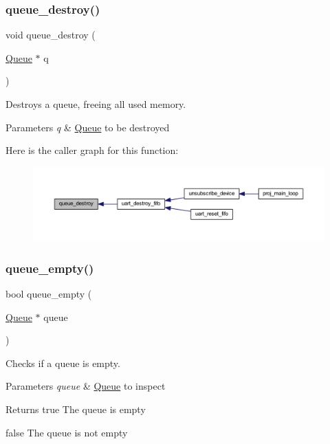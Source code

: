 \subsubsection{\texorpdfstring{queue\+\_\+destroy()}{queue\_destroy()}}
{\footnotesize\ttfamily void queue\+\_\+destroy (\begin{DoxyParamCaption}\item[{\mbox{\hyperlink{struct_queue}{Queue}} $\ast$}]{q }\end{DoxyParamCaption})}



Destroys a queue, freeing all used memory. 


\begin{DoxyParams}{Parameters}
{\em q} & \mbox{\hyperlink{struct_queue}{Queue}} to be destroyed \\
\hline
\end{DoxyParams}
Here is the caller graph for this function\+:\nopagebreak
\begin{figure}[H]
\begin{center}
\leavevmode
\includegraphics[width=350pt]{group__queue_gad21ee75924298937673e2b8d66665466_icgraph}
\end{center}
\end{figure}
\mbox{\label{group__queue_gac13fbf345e3ce6a0136afac6cbc039ad}} 
\subsubsection{\texorpdfstring{queue\+\_\+empty()}{queue\_empty()}}
{\footnotesize\ttfamily bool queue\+\_\+empty (\begin{DoxyParamCaption}\item[{\mbox{\hyperlink{struct_queue}{Queue}} $\ast$}]{queue }\end{DoxyParamCaption})}



Checks if a queue is empty. 


\begin{DoxyParams}{Parameters}
{\em queue} & \mbox{\hyperlink{struct_queue}{Queue}} to inspect \\
\hline
\end{DoxyParams}
\begin{DoxyReturn}{Returns}
true The queue is empty 

false The queue is not empty 
\end{DoxyReturn}
\mbox{\label{group__queue_ga6916e93facd123dd3fb655965b440e0e}} 

